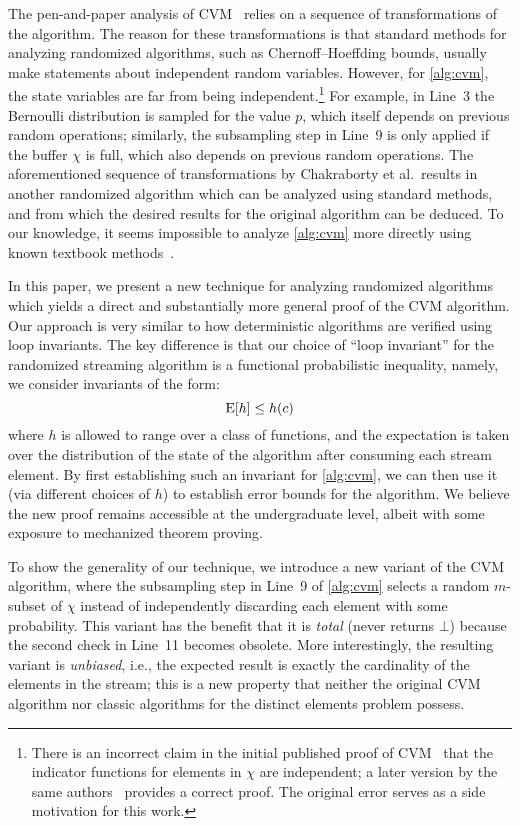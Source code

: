 The pen-and-paper analysis of CVM~\cite{chakraborty2022,chakraborty2023} relies on a sequence of transformations of the algorithm.
The reason for these transformations is that standard methods for analyzing randomized algorithms, such as Chernoff--Hoeffding bounds, usually make statements about independent random variables.
However, for \cref{alg:cvm}, the state variables are far from being independent.\footnote{There is an incorrect claim in the initial published proof of CVM~\cite[Claim 6]{chakraborty2022} that the indicator functions for elements in $\chi$ are independent; a later version by the same authors~\cite{chakraborty2023} provides a correct proof.
The original error serves as a side motivation for this work.}
For example, in Line~3 the Bernoulli distribution is sampled for the value $p$, which itself depends on previous random operations; similarly, the subsampling step in Line~9 is only applied if the buffer $\chi$ is full, which also depends on previous random operations.
The aforementioned sequence of transformations by Chakraborty et al.~results in another randomized algorithm which can be analyzed using standard methods, and from which the desired results for the original algorithm can be deduced.
To our knowledge, it seems impossible to analyze \cref{alg:cvm} more directly using known textbook methods~\cite{alon2000,mitzenmacher2017,motwani1995}.

In this paper, we present a new technique for analyzing randomized algorithms which yields a direct and substantially more general proof of the CVM algorithm.
Our approach is very similar to how deterministic algorithms are verified using loop invariants.
The key difference is that our choice of ``loop invariant'' for the randomized streaming algorithm is a functional probabilistic inequality, namely, we consider invariants of the form:
\[
  \operatorname{\mathrm{E}} [ h ] \leq h(c)
\]
where $h$ is allowed to range over a class of functions, and the expectation is taken over the distribution of the state of the algorithm after consuming each stream element.
By first establishing such an invariant for \cref{alg:cvm}, we can then use it (via different choices of $h$) to establish error bounds for the algorithm.
We believe the new proof remains accessible at the undergraduate level, albeit with some exposure to mechanized theorem proving.

To show the generality of our technique, we introduce a new variant of the CVM algorithm, where the subsampling step in Line~9 of \cref{alg:cvm} selects a random $m$-subset of $\chi$ instead of independently discarding each element with some probability.
This variant has the benefit that it is \emph{total} (never returns $\bot$) because the second check in Line~11 becomes obsolete.
More interestingly, the resulting variant is \emph{unbiased}, i.e., the expected result is exactly the cardinality of the elements in the stream; this is a new property that neither the original CVM algorithm nor classic algorithms for the distinct elements problem possess.

